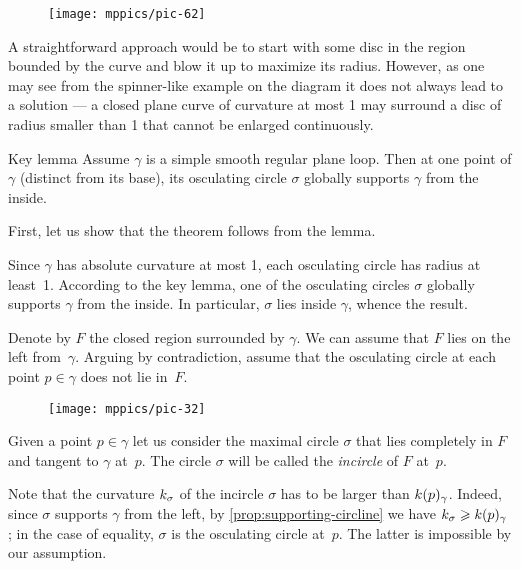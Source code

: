 {

\begin{wrapfigure}{r}{33 mm}
\vskip-4mm
\centering
\texttt{[image: mppics/pic-62]}
\vskip0mm
\end{wrapfigure}

A straightforward approach would be to start with some disc in the region bounded by the curve and blow it up to maximize its radius.
However, as one may see from the spinner-like example on the diagram it does not always lead to a solution --- a closed plane curve of curvature at most 1 may surround a disc of radius smaller than 1 that cannot be enlarged continuously.

}

\begin{thm}{Key lemma}\label{thm:moon}
Assume $\gamma$ is a simple smooth regular plane loop.
Then at one point of $\gamma$ (distinct from its base), its osculating circle $\sigma$ globally supports $\gamma$ from the inside.
\end{thm}

First, let us show that the theorem follows from the lemma.

Since $\gamma$ has absolute curvature at most 1, each osculating circle has radius at least~1.
According to the key lemma, one of the osculating circles $\sigma$ globally supports $\gamma$ from the inside.
In particular, $\sigma$ lies inside $\gamma$, whence the result.
\qeds

Denote by $F$ the closed region surrounded by $\gamma$.
We can assume that $F$ lies on the left from~$\gamma$.
Arguing by contradiction,
assume that the osculating circle at each point $p\in \gamma$ does not lie in~$F$.

\begin{figure}[!ht]%
\vskip-0mm
\centering
\texttt{[image: mppics/pic-32]}
\vskip0mm
\end{figure}

Given a point $p\in\gamma$ let us consider the maximal circle $\sigma$ that lies completely in $F$ and tangent to $\gamma$ at~$p$.
The circle $\sigma$ will be called the {}\emph{incircle} of $F$ at~$p$.

Note that the curvature $k_\sigma$ of the incircle $\sigma$ has to be larger than $k(p)_\gamma$.
Indeed, since $\sigma$ supports $\gamma$ from the left, by \ref{prop:supporting-circline} we have $k_\sigma\geqslant k(p)_\gamma$; in the case of equality, $\sigma$ is the osculating circle at~$p$.
The latter is impossible by our assumption.


